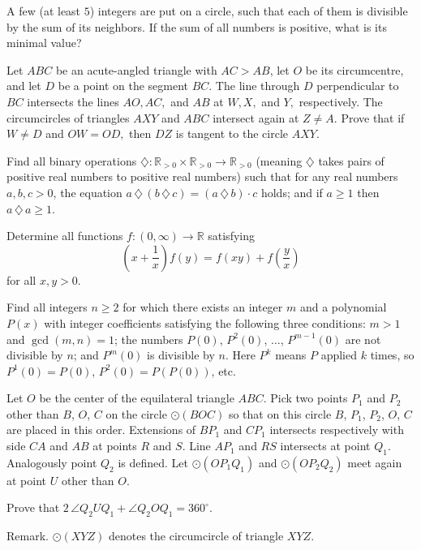 \documentclass[11pt]{scrartcl}
\begin{document}
\begin{problem}[616860610609120]
	A few (at least $5$) integers are put on a circle, such that each of them is divisible by the sum of its neighbors. If the sum of all numbers is positive, what is its minimal value?
\end{problem}
\begin{problem}[282712203118607]
	Let $ABC$ be an acute-angled triangle with $AC > AB$, let $O$ be its circumcentre, and let $D$ be a point on the segment $BC$. The line through $D$ perpendicular to $BC$ intersects the lines $AO, AC,$ and $AB$ at $W, X,$ and $Y,$ respectively. The circumcircles of triangles $AXY$ and $ABC$ intersect again at $Z \ne A$.
Prove that if $W \ne D$ and $OW = OD,$ then $DZ$ is tangent to the circle $AXY.$
\end{problem}
\begin{problem}[2694660444585153591]
Find all binary operations $\diamondsuit: \mathbb R_{>0}\times \mathbb R_{>0}\to \mathbb R_{>0}$ (meaning $\diamondsuit$ takes pairs of positive real numbers to positive real numbers) such that for any real numbers $a, b, c > 0$,
the equation $a\,\diamondsuit\, (b\,\diamondsuit \,c) = (a\,\diamondsuit \,b)\cdot c$ holds; and
if $a\ge 1$ then $a\,\diamondsuit\, a\ge 1$.
\end{problem}
\begin{problem}[5514383858686655851]
Determine all functions $f:(0,\infty)\to\mathbb{R}$ satisfying$$\left(x+\frac{1}{x}\right)f(y)=f(xy)+f\left(\frac{y}{x}\right)$$for all $x,y>0$.
\end{problem}
\begin{problem}[7904897494032012729]
Find all integers $n \ge 2$ for which there exists an integer $m$ and a polynomial $P(x)$ with integer coefficients satisfying the following three conditions:
$m > 1$ and $\gcd(m,n) = 1$;
the numbers $P(0)$, $P^2(0)$, $\ldots$, $P^{m-1}(0)$ are not divisible by $n$; and
$P^m(0)$ is divisible by $n$.
Here $P^k$ means $P$ applied $k$ times, so $P^1(0) = P(0)$, $P^2(0) = P(P(0))$, etc.
\end{problem}
\begin{problem}[518384374486289]
	Let $O$ be the center of the equilateral triangle $ABC$. Pick two points $P_1$ and $P_2$ other than $B$, $O$, $C$ on the circle $\odot(BOC)$ so that on this circle $B$, $P_1$, $P_2$, $O$, $C$ are placed in this order. Extensions of $BP_1$ and $CP_1$ intersects respectively with side $CA$ and $AB$ at points $R$ and $S$. Line $AP_1$ and $RS$ intersects at point $Q_1$. Analogously point $Q_2$ is defined. Let $\odot(OP_1Q_1)$ and $\odot(OP_2Q_2)$ meet again at point $U$ other than $O$.

Prove that $2\,\angle Q_2UQ_1 + \angle Q_2OQ_1 = 360^\circ$.

Remark. $\odot(XYZ)$ denotes the circumcircle of triangle $XYZ$.
\end{problem}
\end{document}
